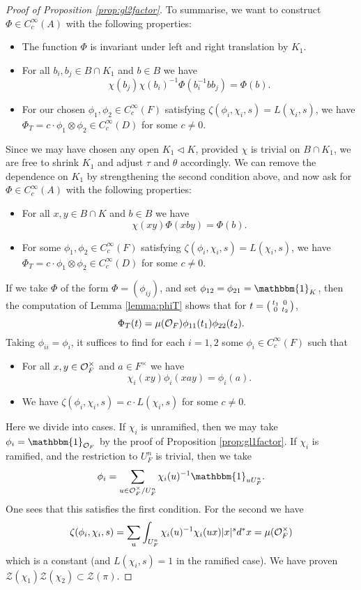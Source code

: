 \begin{proof}[Proof of Proposition \ref{prop:gl2factor}]
    To summarise, we want to construct $\Phi \in C_c^\infty(A)$ with the following properties:
    \begin{itemize}
        \item The function $\Phi$ is invariant under left and right translation by $K_1$.
        \item For all $b_i,b_j \in B \cap K_1$ and $b \in B$ we have $$\chi(b_j)\chi(b_i)^{-1}\Phi(b_i^{-1}bb_j) = \Phi(b).$$
        \item For our chosen $\phi_1,\phi_2 \in C_c^\infty(F)$ satisfying $\zeta(\phi_i,\chi_i,s)=L(\chi_i,s)$, we have $\Phi_T = c \cdot \phi_1 \otimes \phi_2 \in C_c^\infty(D)$ for some $c \neq 0$.
    \end{itemize}
    Since we may have chosen any open $K_1 \lhd K$, provided $\chi$ is trivial on $B \cap K_1$, we are free to shrink $K_1$ and adjust $\tau$ and $\theta$ accordingly. We can remove the dependence on $K_1$ by strengthening the second condition above, and now ask for $\Phi \in C_c^\infty(A)$ with the following properties:
    \begin{itemize}
        \item For all $x,y \in B \cap K$ and $b \in B$ we have $$\chi(xy)\Phi(xby) = \Phi(b).$$
        \item For some $\phi_1,\phi_2 \in C_c^\infty(F)$ satisfying $\zeta(\phi_i,\chi_i,s)=L(\chi_i,s)$, we have $\Phi_T = c \cdot \phi_1 \otimes \phi_2 \in C_c^\infty(D)$ for some $c \neq 0$.
    \end{itemize}
    If we take $\Phi$ of the form $\Phi=(\phi_{ij})$, and set $\phi_{12}=\phi_{21}=\mathbbm{1}_K$, then the computation of Lemma \ref{lemma:phiT} shows that for $t= \begin{psmallmatrix}
        t_1&0\\0&t_2
    \end{psmallmatrix}$,
    $$\Phi_T(t) = \mu(\mathcal{O}_F)\phi_{11}(t_1)\phi_{22}(t_2).$$
    Taking $\phi_{ii}=\phi_i$, it suffices to find for each $i=1,2$ some $\phi_i \in C_c^\infty(F)$ such that
    \begin{itemize}
        \item For all $x,y \in \mathcal{O}_F^\times$ and $a \in F^\times$ we have $$\chi_i(xy)\phi_i(xay) = \phi_i(a).$$
        \item We have $\zeta(\phi_i,\chi_i,s)=c \cdot L(\chi_i,s)$ for some $c \neq 0$.
    \end{itemize}
    Here we divide into cases. If $\chi_i$ is unramified, then we may take $\phi_i = \mathbbm{1}_{\cO_F}$ by the proof of Proposition \ref{prop:gl1factor}. If $\chi_i$ is ramified, and the restriction to $U_F^n$ is trivial, then we take 
    $$ \phi_i = \sum\limits_{u \in \cO_F^\times/U_F^n} \chi_i(u)^{-1} \mathbbm{1}_{uU_F^n}.$$ One sees that this satisfies the first condition. For the second we have 
    $$\zeta(\phi_i,\chi_i,s) = \sum\limits_u \int_{U_F^n} \chi_i(u)^{-1}\chi_i(ux)|x|^s d^*x = \mu(\mathcal{O}_F^\times)$$ which is a constant (and $L(\chi_i,s)=1$ in the ramified case). We have proven $\mathcal Z(\chi_1)\mathcal Z(\chi_2) \subset \mathcal Z(\pi)$.

\end{proof}

